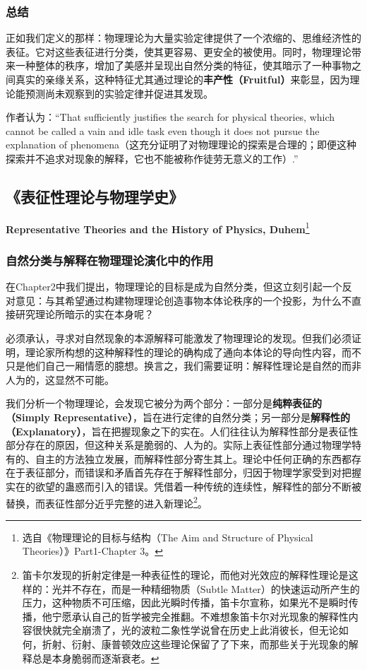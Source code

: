 \documentclass[12pt, a4paper, oneside]{ctexart}
\renewcommand{\b}{\textbf}
\newcommand{\f}{\footnote}
\begin{document}
\subsubsection{总结}
正如我们定义的那样：物理理论为大量实验定律提供了一个浓缩的、思维经济性的表征。它对这些表征进行分类，使其更容易、更安全的被使用。同时，物理理论带来一种整体的秩序，增加了美感并呈现出自然分类的特征，使其暗示了一种事物之间真实的亲缘关系，这种特征尤其通过理论的\b{丰产性（Fruitful）}来彰显，因为理论能预测尚未观察到的实验定律并促进其发现。

作者认为：“That sufficiently justifies the search for physical theories, which cannot be called a vain and idle task even though it does not pursue the explanation of phenomena（这充分证明了对物理理论的探索是合理的；即便这种探索并不追求对现象的解释，它也不能被称作徒劳无意义的工作）.”

\subsection{《表征性理论与物理学史》}
\textbf{Representative Theories and the History of Physics, Duhem}\f{选自《物理理论的目标与结构（The Aim and Structure of Physical Theories）》Part1-Chapter 3。}
\subsubsection{自然分类与解释在物理理论演化中的作用}
在Chapter2中我们提出，物理理论的目标是成为自然分类，但这立刻引起一个反对意见：与其希望通过构建物理理论创造事物本体论秩序的一个投影，为什么不直接研究理论所暗示的实在本身呢？

必须承认，寻求对自然现象的本源解释可能激发了物理理论的发现。但我们必须证明，理论家所构想的这种解释性的理论的确构成了通向本体论的导向性内容，而不只是他们自己一厢情愿的臆想。换言之，我们需要证明：解释性理论是自然的而非人为的，这显然不可能。

我们分析一个物理理论，会发现它被分为两个部分：一部分是\b{纯粹表征的（Simply Representative）}，旨在进行定律的自然分类；另一部分是\b{解释性的（Explanatory）}，旨在把握现象之下的实在。人们往往认为解释性部分是表征性部分存在的原因，但这种关系是脆弱的、人为的。实际上表征性部分通过物理学特有的、自主的方法独立发展，而解释性部分寄生其上。理论中任何正确的东西都存在于表征部分，而错误和矛盾首先存在于解释性部分，归因于物理学家受到对把握实在的欲望的蛊惑而引入的错误。凭借着一种传统的连续性，解释性的部分不断被替换，而表征性部分近乎完整的进入新理论\f{笛卡尔发现的折射定律是一种表征性的理论，而他对光效应的解释性理论是这样的：光并不存在，而是一种精细物质（Subtle Matter）的快速运动所产生的压力，这种物质不可压缩，因此光瞬时传播，笛卡尔宣称，如果光不是瞬时传播，他宁愿承认自己的哲学被完全推翻。不难想象笛卡尔对光现象的解释性内容很快就完全崩溃了，光的波粒二象性学说曾在历史上此消彼长，但无论如何，折射、衍射、康普顿效应这些理论保留了了下来，而那些关于光现象的解释总是本身脆弱而逐渐衰老。}。
\end{document}
